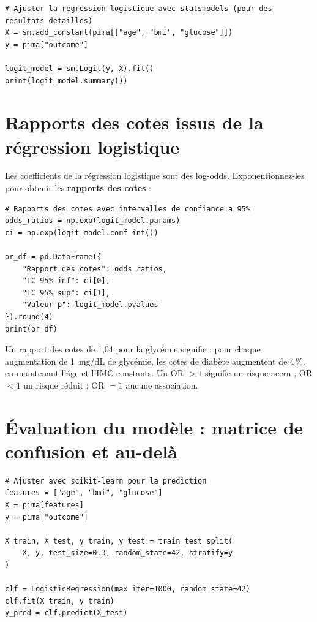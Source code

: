\begin{verbatim}
# Ajuster la regression logistique avec statsmodels (pour des resultats detailles)
X = sm.add_constant(pima[["age", "bmi", "glucose"]])
y = pima["outcome"]

logit_model = sm.Logit(y, X).fit()
print(logit_model.summary())
\end{verbatim}

\section{Rapports des cotes issus de la r\'egression logistique}

Les coefficients de la r\'egression logistique sont des log-odds. Exponentionnez-les pour obtenir les \textbf{rapports des cotes} :

\begin{verbatim}
# Rapports des cotes avec intervalles de confiance a 95%
odds_ratios = np.exp(logit_model.params)
ci = np.exp(logit_model.conf_int())

or_df = pd.DataFrame({
    "Rapport des cotes": odds_ratios,
    "IC 95% inf": ci[0],
    "IC 95% sup": ci[1],
    "Valeur p": logit_model.pvalues
}).round(4)
print(or_df)
\end{verbatim}

\begin{clinicalnote}
Un rapport des cotes de 1,04 pour la glyc\'emie signifie : pour chaque augmentation de 1~mg/dL de glyc\'emie, les cotes de diab\`ete augmentent de 4\,\%, en maintenant l'\'age et l'IMC constants. Un OR $> 1$ signifie un risque accru ; OR $< 1$ un risque r\'eduit ; OR $= 1$ aucune association.
\end{clinicalnote}

\section{\'Evaluation du mod\`ele : matrice de confusion et au-del\`a}

\begin{verbatim}
# Ajuster avec scikit-learn pour la prediction
features = ["age", "bmi", "glucose"]
X = pima[features]
y = pima["outcome"]

X_train, X_test, y_train, y_test = train_test_split(
    X, y, test_size=0.3, random_state=42, stratify=y
)

clf = LogisticRegression(max_iter=1000, random_state=42)
clf.fit(X_train, y_train)
y_pred = clf.predict(X_test)
\end{verbatim}

